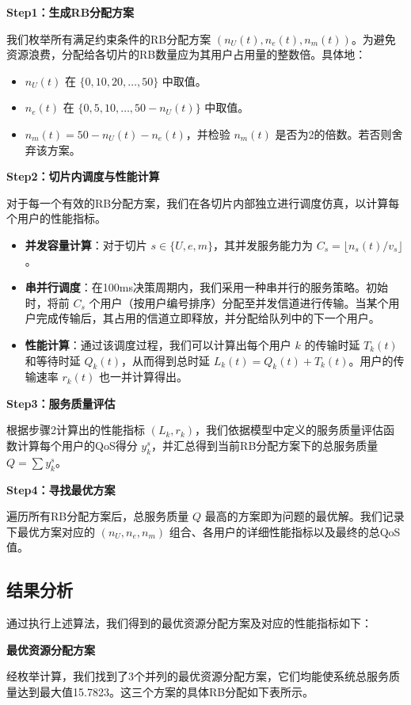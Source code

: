 \textbf{Step1：生成RB分配方案}

我们枚举所有满足约束条件的RB分配方案 $(n_U(t), n_e(t), n_m(t))$。为避免资源浪费，分配给各切片的RB数量应为其用户占用量的整数倍。具体地：
\begin{itemize}
    \item $n_U(t)$ 在 $\{0, 10, 20, \dots, 50\}$ 中取值。
    \item $n_e(t)$ 在 $\{0, 5, 10, \dots, 50 - n_U(t)\}$ 中取值。
    \item $n_m(t) = 50 - n_U(t) - n_e(t)$，并检验 $n_m(t)$ 是否为2的倍数。若否则舍弃该方案。
\end{itemize}

\textbf{Step2：切片内调度与性能计算}

对于每一个有效的RB分配方案，我们在各切片内部独立进行调度仿真，以计算每个用户的性能指标。
\begin{itemize}
    \item \textbf{并发容量计算}：对于切片 $s \in \{U, e, m\}$，其并发服务能力为 $C_s = \lfloor n_s(t) / v_s \rfloor$。
    \item \textbf{串并行调度}：在100ms决策周期内，我们采用一种串并行的服务策略。初始时，将前 $C_s$ 个用户（按用户编号排序）分配至并发信道进行传输。当某个用户完成传输后，其占用的信道立即释放，并分配给队列中的下一个用户。
    \item \textbf{性能计算}：通过该调度过程，我们可以计算出每个用户 $k$ 的传输时延 $T_k(t)$ 和等待时延 $Q_k(t)$，从而得到总时延 $L_k(t) = Q_k(t) + T_k(t)$。用户的传输速率 $r_k(t)$ 也一并计算得出。
\end{itemize}

\textbf{Step3：服务质量评估}

根据步骤2计算出的性能指标 $(L_k, r_k)$，我们依据模型中定义的服务质量评估函数计算每个用户的QoS得分 $y_k^s$，并汇总得到当前RB分配方案下的总服务质量 $Q = \sum y_k^s$。

\textbf{Step4：寻找最优方案}

遍历所有RB分配方案后，总服务质量 $Q$ 最高的方案即为问题的最优解。我们记录下最优方案对应的 $(n_U, n_e, n_m)$ 组合、各用户的详细性能指标以及最终的总QoS值。

\subsection{结果分析}
通过执行上述算法，我们得到的最优资源分配方案及对应的性能指标如下：

\textbf{最优资源分配方案}

经枚举计算，我们找到了3个并列的最优资源分配方案，它们均能使系统总服务质量达到最大值15.7823。这三个方案的具体RB分配如下表所示。

